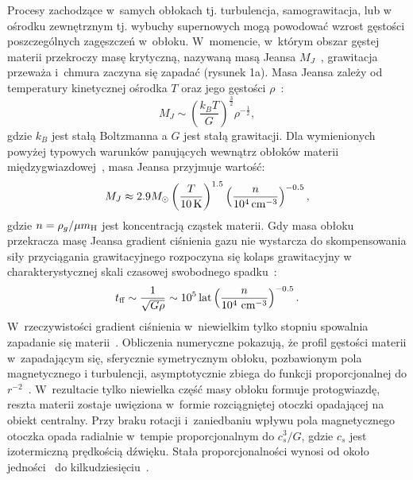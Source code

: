 \par Procesy zachodzące w~samych obłokach tj. turbulencja, samograwitacja, lub
w ośrodku zewnętrznym tj.  wybuchy supernowych mogą powodować wzrost gęstości
poszczególnych zagęszczeń w~obłoku. W~momencie, w~którym obszar gęstej materii
przekroczy  masę krytyczną, nazywaną masą Jeansa $M_J$~\cite{J1902, J1928},
grawitacja przeważa i~chmura zaczyna się zapadać (rysunek 1a). Masa Jeansa
zależy od temperatury kinetycznej ośrodka $T$ oraz jego gęstości
$\rho$~\cite{H64}:
%
\begin{equation} M_J \sim
   \left( \frac{k_B T}{G} \right) ^\frac{3}{2} {\rho}^{-\frac{1}{2}},
\end{equation}
%
gdzie $k_B$ jest stałą Boltzmanna a $G$ jest stałą grawitacji.
Dla wymienionych powyżej typowych warunków panujących wewnątrz obłoków materii
międzygwiazdowej~\cite{BM89}, masa Jeansa przyjmuje wartość:
%
\begin{equation}
 M_J \approx 2.9 M_{\odot} \left(\frac{T}{10\hbox{$\thinspace\textrm{K}$}}\right)^{1.5} 
 \left(\frac{n}{10^4\hbox{$\thinspace\textrm{cm}$}^{-3}}\right)^{-0.5},
\end{equation}
%
gdzie $n = \rho_g / \mu \hbox{$m_{\textrm{H}}$}$ jest koncentracją cząstek materii.
Gdy masa obłoku przekracza masę Jeansa gradient ciśnienia gazu nie wystarcza do
skompensowania siły przyciągania grawitacyjnego rozpoczyna się kolaps
grawitacyjny w charakterystycznej skali czasowej swobodnego spadku~\cite{Spitzer1978}:
%
\begin{equation}
   t_{\textrm{ff}} \sim \frac{1}{\sqrt{G\rho}} \sim 10^5\hbox{$\thinspace\textrm{lat}$}
   \left(\frac{n}{10^4\thinspace \hbox{$\thinspace\textrm{cm}$}^{-3}}\right)^{-0.5}.
\end{equation}
%
W~rzeczywistości gradient ciśnienia w~niewielkim tylko stopniu spowalnia
zapadanie się materii~\cite{T82}. Obliczenia numeryczne pokazują, że profil
gęstości materii w~zapadającym się, sferycznie symetrycznym obłoku, pozbawionym
pola magnetycznego i turbulencji, asymptotycznie zbiega do funkcji
proporcjonalnej do $r^{-2}$~\cite{L69}. W~rezultacie tylko niewielka część masy
obłoku formuje protogwiazdę, reszta materii zostaje uwięziona w~formie
rozciągniętej otoczki opadającej na obiekt centralny. Przy braku rotacji
i~zaniedbaniu wpływu pola magnetycznego otoczka opada radialnie w~tempie
proporcjonalnym do $c_s^3 / G$, gdzie $c_s$ jest izotermiczną prędkością
dźwięku.  Stała proporcjonalności wynosi od około jedności~\cite{S77} do
kilkudziesięciu~\cite{H77}.

